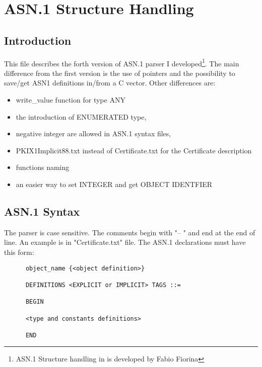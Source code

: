 \chapter{ASN.1 Structure Handling}


\section{Introduction}
 This file describes the forth version of ASN.1 parser I
developed\footnote{ASN.1 Structure handling in \gnutls{} is developed by Fabio
Fiorina}.
The main difference from the first version is the use of pointers and the
possibility to save/get ASN1 definitions in/from a C vector.
Other differences are:
\begin{itemize}
\item write\_value function for type ANY
\item the introduction of ENUMERATED type,
\item negative integer are allowed in ASN.1 syntax files,
\item PKIX1Implicit88.txt instead of Certificate.txt for the Certificate description
\item functions naming 
\item an easier way to set INTEGER and get OBJECT IDENTFIER  
\end{itemize}


\section{ASN.1 Syntax}
The parser is case sensitive. The comments begin with "-- " and end at the end of line.
An example is in "Certificate.txt" file.
The ASN.1 declarations must have this form:
      
\begin{verbatim}
      object_name {<object definition>}

      DEFINITIONS <EXPLICIT or IMPLICIT> TAGS ::=

      BEGIN 

      <type and constants definitions>

      END
\end{verbatim}

